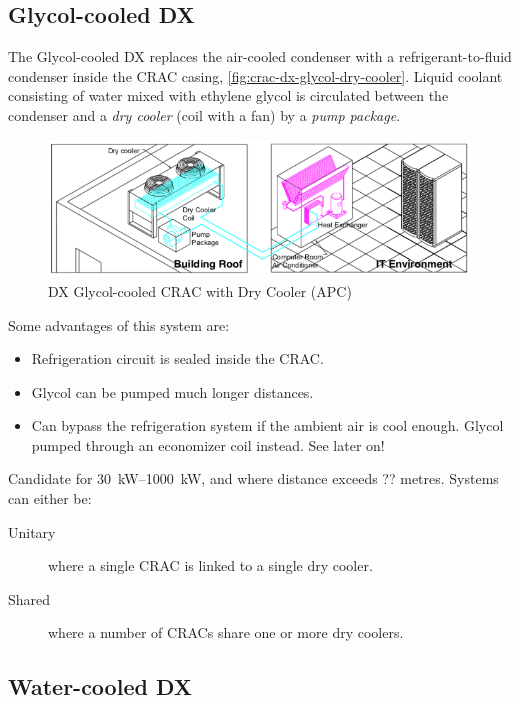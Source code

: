 \documentclass{pgnotes}
\begin{document}
\newpage
\subsection{Glycol-cooled DX}

The Glycol-cooled DX replaces the air-cooled condenser with a refrigerant-to-fluid condenser inside the CRAC casing, \autoref{fig:crac-dx-glycol-dry-cooler}.
Liquid coolant consisting of water mixed with ethylene glycol is circulated between the condenser and a \textit{dry cooler} (coil with a fan) by a \textit{pump package}.

\begin{figure}[hptb]
  \centering
  \includegraphics[width=1.0\linewidth]{crac_dx_glycol_schematic}
  \caption{DX Glycol-cooled CRAC with Dry Cooler (APC)}
  \label{fig:crac-dx-glycol-dry-cooler}
\end{figure}


Some advantages of this system are:
\begin{itemize}
\item Refrigeration circuit is sealed inside the CRAC.
\item Glycol can be pumped much longer distances.
\item Can bypass the refrigeration system if the ambient air is cool enough. Glycol pumped through an economizer coil instead. See later on!
\end{itemize}

Candidate for \SIrange{30}{1000}{\kilo\watt}, and where distance exceeds ?? metres.
Systems can either be:
\begin{description}
\item[Unitary] where a single CRAC is linked to a single dry cooler.
\item[Shared] where a number of CRACs share one or more dry coolers.
\end{description}

\newpage
\subsection{Water-cooled DX}
\end{document}
